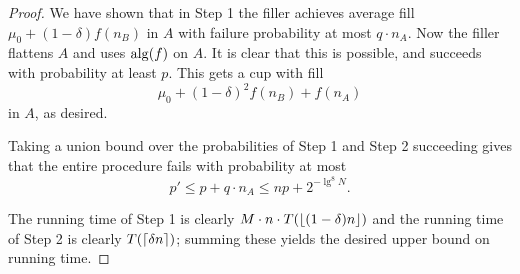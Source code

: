 \begin{proof}
We have shown that in Step 1 the filler achieves average fill
$\mu_0 + (1-\delta)f(n_B)$ in $A$ with failure probability at
most $q \cdot n_A$.
Now the filler flattens $A$ and uses $\operatorname{\text{\textup{alg}}}(f)$ on $A$.
It is clear that this is possible, and succeeds with probability
at least $p$.
This gets a cup with fill 
$$\mu_0 + (1-\delta)^2 f(n_B) + f(n_A)$$
in $A$, as desired.

Taking a union bound over the probabilities of Step 1 and Step 2
succeeding gives that the entire procedure fails with probability
at most 
$$p' \le p + q \cdot n_A \le np + 2^{-\lg^8 N}.$$

The running time of Step 1 is clearly $M\cdot n\cdot
T(\left\lfloor (1-\delta)n \right\rfloor)$ and the running time of Step 2 is clearly
$T(\left\lceil \delta n \right\rceil)$; summing these yields the desired upper
bound on running time.

\end{proof}

